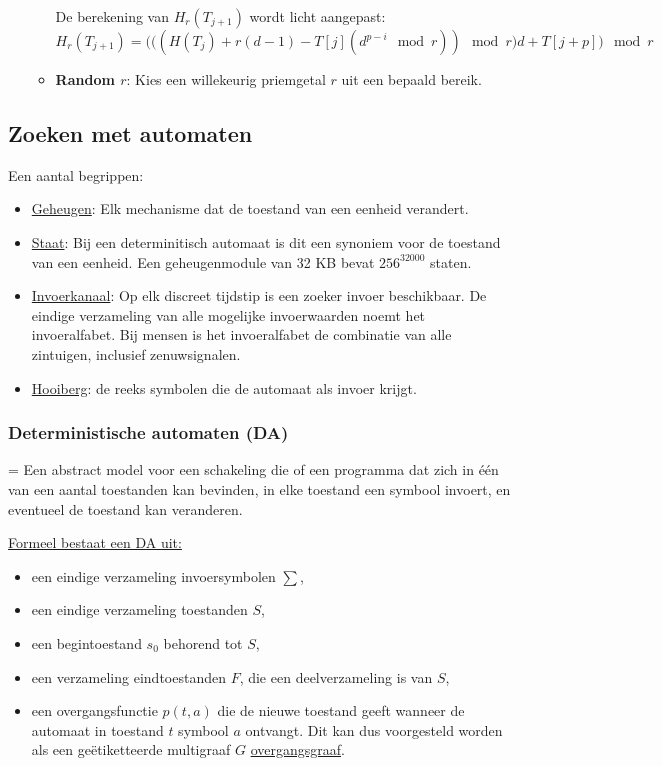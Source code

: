 \documentclass{report}
\begin{document}
\begin{itemize}
\begin{itemize}
		De berekening van $H_r(T_{j + 1})$ wordt licht aangepast:
		$$H_r(T_{j + 1}) = \bigg(\big((H(T_j) + r(d - 1) - T[j](d^{p - i} \mod r))\mod r \big)d + T[j + p] \bigg) \mod r$$

		\item \textbf{Random $r$}: Kies een willekeurig priemgetal $r$ uit een bepaald bereik. 

	\end{itemize}
\end{itemize}
\subsection{Zoeken met automaten}
Een aantal begrippen:
\begin{itemize}
	\item[\info] \underline{Geheugen}: Elk mechanisme dat de toestand van een eenheid verandert.
	\item[\info] \underline{Staat}: Bij een determinitisch automaat is dit een synoniem voor de toestand van een eenheid. Een geheugenmodule van 32 KB bevat $256^{32000}$ staten.
	\item[\info] \underline{Invoerkanaal}: Op elk discreet tijdstip is een zoeker invoer beschikbaar. De eindige verzameling van alle mogelijke invoerwaarden noemt het invoeralfabet. Bij mensen is het invoeralfabet de combinatie van alle zintuigen, inclusief zenuwsignalen.
	\item[\info] \underline{Hooiberg}: de reeks symbolen die de automaat als invoer krijgt.
\end{itemize}
\subsubsection{Deterministische automaten (DA)}
= Een abstract model voor een schakeling die of een programma dat zich in één van een aantal toestanden kan bevinden, in elke toestand een symbool invoert, en eventueel de toestand kan veranderen.

\underline{Formeel bestaat een DA uit:}
\begin{itemize}
	\item[\info] een eindige verzameling invoersymbolen $\sum$,
	\item[\info] een eindige verzameling toestanden $S$,
	\item[\info] een begintoestand $s_0$ behorend tot $S$,
	\item[\info] een verzameling eindtoestanden $F$, die een deelverzameling is van $S$,
	\item[\info] een overgangsfunctie $p(t, a)$ die de nieuwe toestand geeft wanneer de automaat in toestand $t$ symbool $a$ ontvangt. Dit kan dus voorgesteld worden als een geëtiketteerde multigraaf $G$ \underline{overgangsgraaf}.
\end{itemize}
\end{document}
